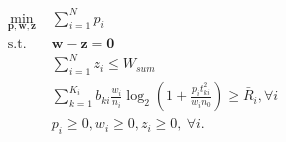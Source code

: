 \documentclass[journal]{IEEEtran}
\begin{document}
\begin{subequations}\label{eq11}
	\begin{align}
	\min_{\mathbf{p}, \mathbf{w}, \mathbf{z}}\ & \sum\limits_{i = 1}^{N} p_i \label{eq11a} \\ \mbox{s.t.} \quad &  \mathbf{w} - \mathbf{z} = \mathbf{0} \label{eq11b} \\ \quad &  \sum\limits_{i = 1}^{N}z_i \leq W_{sum} \label{eq11c} \\ \quad &  \sum\limits_{k = 1}^{K_i}b_{ki}\frac{w_i}{n_i}\log_2\left(1 + \frac{p_it_{ki}^2}{w_in_0}\right) \geq \bar{R}_i, \forall i \label{eq11d}\\
	& p_i \geq 0, w_i \geq 0, z_i \geq 0, \ \forall i. \label{eq11e}
	\end{align}
\end{subequations}
\end{document}
